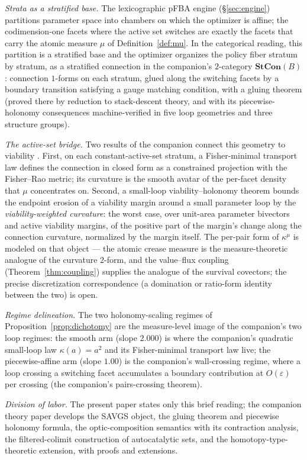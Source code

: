 \documentclass[11pt,a4paper]{article}
\theoremstyle{plain}
\theoremstyle{definition}
\theoremstyle{remark}
\newcommand{\kmu}{\kappa^{\mu}}
\begin{document}
\emph{Strata as a stratified base.} The lexicographic pFBA engine
(\S\ref{sec:engine}) partitions parameter space into chambers on
which the optimizer is affine; the codimension-one facets where the
active set switches are exactly the facets that carry the atomic
measure $\mu$ of Definition~\ref{def:mu}. In the categorical reading,
this partition is a stratified base and the optimizer organizes the
policy fiber stratum by stratum, as a stratified connection in the
companion's $2$-category $\mathbf{StCon}(B)$: connection $1$-forms on
each stratum, glued along the switching facets by a boundary
transition satisfying a gauge matching condition, with a gluing
theorem (proved there by reduction to stack-descent theory, and with
its piecewise-holonomy consequences machine-verified in five loop
geometries and three structure groups).

\emph{The active-set bridge.} Two results of the companion connect
this geometry to viability \citep{zai2026categorical}. First, on
each constant-active-set stratum, a Fisher-minimal transport law
defines the connection in closed form as a constrained projection
with the Fisher--Rao metric; its curvature is the smooth avatar of
the per-facet density that $\mu$ concentrates on. Second, a
small-loop viability--holonomy theorem bounds the endpoint erosion
of a viability margin around a small parameter loop by the
\emph{viability-weighted curvature}:
the worst case, over unit-area parameter bivectors and active
viability margins, of the positive part of the margin's change along
the connection curvature, normalized by the margin itself. The
per-pair form of
$\kmu$ is modeled on that object --- the atomic crease measure is
the measure-theoretic analogue of the curvature $2$-form, and the
value--flux coupling (Theorem~\ref{thm:coupling}) supplies the
analogue of the survival covectors; the precise discretization
correspondence (a domination or ratio-form identity between the two)
is open.

\emph{Regime delineation.} The two holonomy-scaling regimes of
Proposition~\ref{prop:dichotomy} are the measure-level image of the
companion's two loop regimes: the smooth arm (slope $2.000$) is
where the companion's quadratic small-loop law $\kappa(a) = a^{2}$
and its Fisher-minimal transport law live; the piecewise-affine
arm (slope $1.00$) is the companion's wall-crossing regime, where
a loop crossing a switching facet accumulates a boundary
contribution at $O(\varepsilon)$ per crossing (the companion's
pairs-crossing theorem).

\emph{Division of labor.} The present paper states only this brief
reading; the companion theory paper develops the SAVGS object, the
gluing theorem and piecewise holonomy formula, the
optic-composition semantics with its contraction analysis, the
filtered-colimit construction of autocatalytic sets, and the
homotopy-type-theoretic extension, with proofs and extensions.
\end{document}
